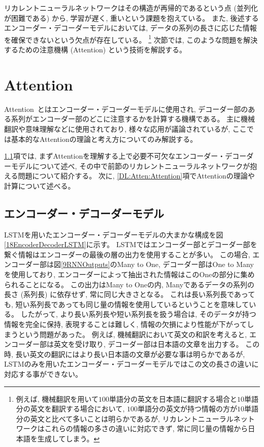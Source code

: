 リカレントニューラルネットワークはその構造が再帰的であるという点 (並列化が困難である) から, 学習が遅く, 重いという課題を抱えている。
また, 後述するエンコーダー・デコーダーモデルにおいては, データの系列の長さに応じた情報を確保できないという欠点が存在している。
\footnote{例えば, 機械翻訳を用いて$100$単語分の英文を日本語に翻訳する場合と$10$単語分の英文を翻訳する場合において, $100$単語分の英文が持つ情報の方が$10$単語分の英文と比べて多いことは明らかであるが, リカレントニューラルネットワークはこれらの情報の多さの違いに対応できず, 常に同じ量の情報から日本語を生成してしまう。}
次節では, このような問題を解決するための注意機構 (Attention) という技術を解説する。

\newpage
\section{Attention} \label{DL:Attention}

Attention~\cite{BahdanauAttention, LuongAttention}とはエンコーダー・デコーダーモデルに使用され, デコーダー部のある系列がエンコーダー部のどこに注意するかを計算する機構である。
主に機械翻訳や意味理解などに使用されており, 様々な応用が議論されているが, ここでは基本的なAttentionの理論と考え方についてのみ解説する。

\ref{DL:Atten:EncoderDecoderModel}項では, まずAttentionを理解する上で必要不可欠なエンコーダー・デコーダーモデルについて述べ, その中で前節のリカレントニューラルネットワークが抱える問題について紹介する。
次に, \ref{DL:Atten:Attention}項でAttentionの理論や計算について述べる。


\subsection{エンコーダー・デコーダーモデル} \label{DL:Atten:EncoderDecoderModel}

LSTMを用いたエンコーダー・デコーダーモデルの大まかな構成を図\ref{18EncoderDecoderLSTM}に示す。
LSTMではエンコーダー部とデコーダー部を繋ぐ情報はエンコーダーの最後の層の出力を使用することが多い。
この場合, エンコーダー部は図\ref{9RNNOutputs}のMany to One, デコーダー部はOne to Manyを使用しており, エンコーダーによって抽出された情報はこのOneの部分に集められることになる。
この出力はMany to Oneの内, Manyであるデータの系列の長さ (系列長) に依存せず, 常に同じ大きさとなる。
これは長い系列長であっても, 短い系列長であっても同じ量の情報を使用しているということを意味している。
したがって, より長い系列長や短い系列長を扱う場合は, そのデータが持つ情報を完全に保持, 表現することは難しく, 情報の欠損により性能が下がってしまうという問題があった。
例えば, 機械翻訳において英文の和訳を考えると, エンコーダー部は英文を受け取り, デコーダー部は日本語の文章を出力する。
この時, 長い英文の翻訳にはより長い日本語の文章が必要な事は明らかであるが, LSTMのみを用いたエンコーダー・デコーダーモデルではこの文の長さの違いに対応する事ができない。

